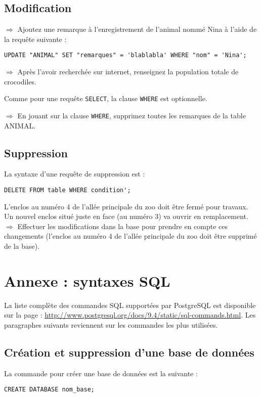 \documentclass[11pt]{article}
\begin{document}
			\subsection{Modification}
				$\Rightarrow$ Ajoutez une remarque à l'enregistrement de l'animal nommé Nina à l'aide de la requête suivante :
				\begin{lstlisting}
UPDATE "ANIMAL" SET "remarques" = 'blablabla' WHERE "nom" = 'Nina';
				\end{lstlisting}		
				
				$\Rightarrow$ Après l'avoir recherchée sur internet, renseignez la population totale de crocodiles.
				
				Comme pour une requête \lstinline{SELECT}, la clause \lstinline{WHERE} est optionnelle.
				
				$\Rightarrow$ En jouant sur la clause \lstinline{WHERE}, supprimez toutes les remarques de la table ANIMAL.
				
			
			\subsection{Suppression}
				La syntaxe d'une requête de suppression est :
				\begin{lstlisting}
DELETE FROM table WHERE condition';
				\end{lstlisting}
				
				L'enclos au numéro 4 de l'allée principale du zoo doit être fermé pour travaux. Un nouvel enclos situé juste en face (au numéro 3) va ouvrir en remplacement.
				$\Rightarrow$ Effectuer les modifications dans la base pour prendre en compte ces changements (l'enclos au numéro 4 de l'allée principale du zoo doit être supprimé de la base).
			
			
		\newpage
		
		
		\section{Annexe : syntaxes SQL}
			La liste complète des commandes SQL supportées par PostgreSQL est disponible sur la page : \url{http://www.postgresql.org/docs/9.4/static/sql-commands.html}. Les paragraphes suivants reviennent sur les commandes les plus utilisées.
			
			\subsection{Création et suppression d'une base de données}
				La commande pour créer une base de données est la suivante :\\
				\begin{lstlisting}
CREATE DATABASE nom_base;
				\end{lstlisting}
			
\end{document}
